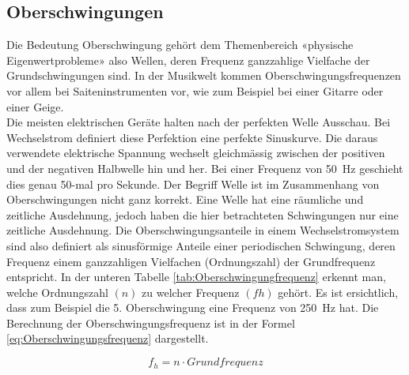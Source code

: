 \subsection{Oberschwingungen}
Die Bedeutung Oberschwingung gehört dem Themenbereich «physische Eigenwertprobleme» also Wellen, deren Frequenz ganzzahlige Vielfache der Grundschwingungen sind. In der Musikwelt kommen Oberschwingungsfrequenzen vor allem bei Saiteninstrumenten vor, wie zum Beispiel bei einer Gitarre oder einer Geige.\\
Die meisten elektrischen Geräte halten nach der perfekten Welle Ausschau. Bei Wechselstrom definiert diese Perfektion eine perfekte Sinuskurve. Die daraus verwendete elektrische Spannung wechselt gleichmässig zwischen der positiven und der negativen Halbwelle hin und her. Bei einer Frequenz von \SI{50}{Hz} geschieht dies genau 50-mal pro Sekunde. Der Begriff Welle ist im Zusammenhang von Oberschwingungen nicht ganz korrekt. Eine Welle hat eine räumliche und zeitliche Ausdehnung, jedoch haben die hier betrachteten Schwingungen nur eine zeitliche Ausdehnung. Die Oberschwingungsanteile in einem Wechselstromsystem sind also definiert als sinusförmige Anteile einer periodischen Schwingung, deren Frequenz einem ganzzahligen Vielfachen (Ordnungszahl) der Grundfrequenz entspricht. In der unteren Tabelle \ref{tab:Oberschwingungfrequenz} erkennt man, welche Ordnungszahl $(n)$  zu welcher Frequenz $(fh)$ gehört. Es ist ersichtlich, dass zum Beispiel die 5. Oberschwingung eine Frequenz von \SI{250}{Hz} hat. Die Berechnung der Oberschwingungsfrequenz ist in der Formel \ref{eq:Oberschwingungsfrequenz} dargestellt.


\begin{equation}\label{eq:Oberschwingungsfrequenz}
f_h = n \cdot Grundfrequenz
\end{equation}

